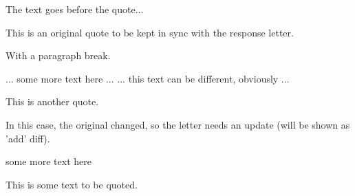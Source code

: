 
The text goes before the quote...

This is an original quote
to be kept in sync with the response letter.

With a paragraph break.


... some more text here ...
... this text can be different, obviously ...

This is another quote.

In this case, the original changed, so the letter needs an update
(will be shown as 'add' diff).


some more text here

This is some text
to
be
quoted.
